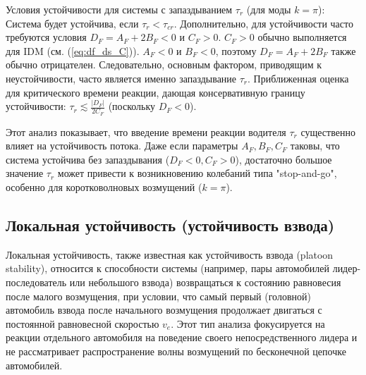\documentclass[12pt, a4paper]{article}
\begin{document}
Условия устойчивости для системы с запаздыванием $\tau_r$ (для моды $k=\pi$):
Система будет устойчива, если $\tau_r < \tau_{cr}$. Дополнительно, для устойчивости часто требуются условия $D_F = A_F + 2B_F < 0$ и $C_F > 0$.
$C_F > 0$ обычно выполняется для IDM (см. (\ref{eq:df_ds_C})).
$A_F < 0$ и $B_F < 0$, поэтому $D_F = A_F + 2B_F$ также обычно отрицателен.
Следовательно, основным фактором, приводящим к неустойчивости, часто является именно запаздывание $\tau_r$.
Приближенная оценка для критического времени реакции, дающая консервативную границу устойчивости: $\tau_r \lesssim \frac{|D_F|}{2C_F}$ (поскольку $D_F<0$).

Этот анализ показывает, что введение времени реакции водителя $\tau_r$ существенно влияет на устойчивость потока. Даже если параметры $A_F, B_F, C_F$ таковы, что система устойчива без запаздывания ($D_F<0, C_F>0$), достаточно большое значение $\tau_r$ может привести к возникновению колебаний типа "stop-and-go", особенно для коротковолновых возмущений ($k=\pi$).


\subsection{Локальная устойчивость (устойчивость взвода)}
\label{subsec:platoon_stability}

Локальная устойчивость, также известная как устойчивость взвода (platoon stability), относится к способности системы (например, пары автомобилей лидер-последователь или небольшого взвода) возвращаться к состоянию равновесия после малого возмущения, при условии,
что самый первый (головной) автомобиль взвода после начального возмущения продолжает двигаться с постоянной равновесной скоростью $v_e$. Этот тип анализа фокусируется на реакции отдельного автомобиля на поведение своего непосредственного лидера и не рассматривает распространение волны возмущений по бесконечной цепочке автомобилей.
\end{document}
